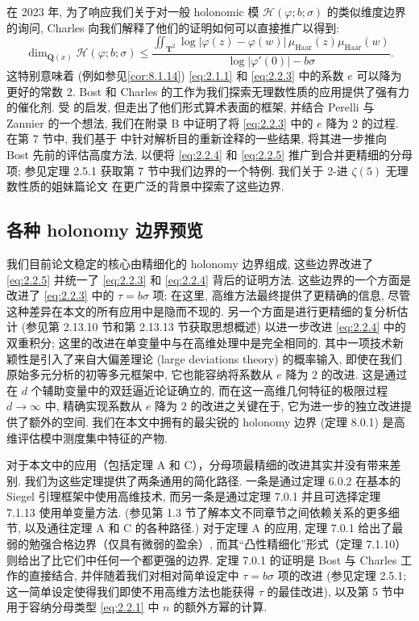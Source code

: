 在 2023 年, 为了响应我们关于对一般 holonomic 模 \(\mathcal{H}(\varphi; b; \sigma)\) 的类似维度边界的询问, 
Charles 向我们解释了他们的证明如何可以直接推广以得到:
\begin{equation}\label{eq:2.2.5}
\dim_{\mathbf{Q}(x)} \mathcal{H}(\varphi; b; \sigma) \le \frac{\iint_{\mathbf{T}^2} \log \lvert\varphi(z) - \varphi(w)\rvert \, \mu_{\mathrm{Haar}}(z) \mu_{\mathrm{Haar}}(w)}{\log \lvert\varphi'(0)\rvert - b\sigma}.
\end{equation}
这特别意味着 (例如参见\autoref{cor:8.1.14}) \eqref{eq:2.1.1} 和 \eqref{eq:2.2.3} 中的系数 $e$ 可以降为更好的常数 $2$.
Bost 和 Charles 的工作为我们探索无理数性质的应用提供了强有力的催化剂.
受 \cite{BC22} 的启发, 但走出了他们形式算术表面的框架, 并结合 Perelli 与 Zannier \cite{PZ84} 的一个想法, 
我们在附录 B 中证明了将 \eqref{eq:2.2.3} 中的 $e$ 降为 $2$ 的过程.
在第 7 节中, 我们基于 \cite{BC22} 中针对解析目的重新诠释的一些结果, 
将其进一步推向 Bost 先前的评估高度方法, 
以便将 \eqref{eq:2.2.4} 和 \eqref{eq:2.2.5} 推广到合并更精细的分母项; 
参见定理 2.5.1 获取第 7 节中我们边界的一个特例.
我们关于 2-进 $\zeta(5)$ 无理数性质的姐妹篇论文 \cite{CDT24} 在更广泛的背景中探索了这些边界.

\subsection{各种 holonomy 边界预览}\label{sec:2.3}

我们目前论文稳定的核心由精细化的 holonomy 边界组成, 这些边界改进了 \eqref{eq:2.2.5} 并统一了 \eqref{eq:2.2.3} 和 \eqref{eq:2.2.4} 背后的证明方法.
这些边界的一个方面是改进了 \eqref{eq:2.2.3} 中的 \(\tau = b\sigma\) 项; 
在这里, 高维方法最终提供了更精确的信息, 尽管这种差异在本文的所有应用中是隐而不现的.
另一个方面是进行更精细的复分析估计 (参见第 2.13.10 节和第 2.13.13 节获取思想概述) 
以进一步改进 \eqref{eq:2.2.4} 中的双重积分; 
这里的改进在单变量中与在高维处理中是完全相同的.
其中一项技术新颖性是引入了来自大偏差理论 (large deviations theory) 的概率输入, 
即使在我们 \cite[§ 2]{CDT21} 原始多元分析的初等多元框架中, 
它也能容纳将系数从 $e$ 降为 $2$ 的改进.
这是通过在 $d$ 个辅助变量中的双廷逼近论证确立的, 
而在这一高维几何特征的极限过程 $d \to \infty$ 中, 
精确实现系数从 $e$ 降为 $2$ 的改进之关键在于, 它为进一步的独立改进提供了额外的空间.
我们在本文中拥有的最尖锐的 holonomy 边界 (定理 8.0.1) 是高维评估模中测度集中特征的产物.

对于本文中的应用（包括定理 A 和 C），分母项最精细的改进其实并没有带来差别.
我们为这些定理提供了两条通用的简化路径.
一条是通过定理 6.0.2 在基本的 Siegel 引理框架中使用高维技术, 
而另一条是通过定理 7.0.1 并且可选择定理 7.1.13 使用单变量方法.
(参见第 1.3 节了解本文不同章节之间依赖关系的更多细节, 以及通往定理 A 和 C 的各种路径.)
对于定理 A 的应用, 定理 7.0.1 给出了最弱的勉强合格边界（仅具有微弱的盈余）, 
而其``凸性精细化''形式（定理 7.1.10）则给出了比它们中任何一个都更强的边界.
定理 7.0.1 的证明是 Bost 与 Charles 工作的直接结合, 
并伴随着我们对相对简单设定中 \(\tau = b\sigma\) 项的改进 (参见定理 2.5.1; 这一简单设定使得我们即使不用高维方法也能获得 \(\tau\) 的最佳改进), 
以及第 5 节中用于容纳分母类型 \eqref{eq:2.2.1} 中 $n$ 的额外方幂的计算.

